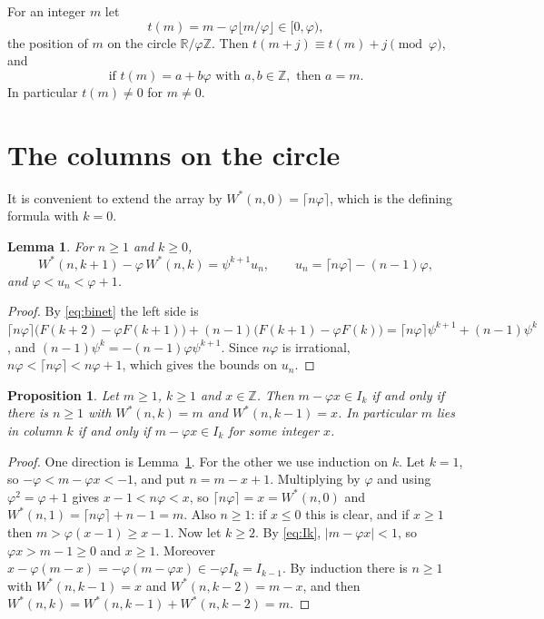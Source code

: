 \documentclass[12pt]{article}
\newcommand{\fl}[1]{\lfloor #1 \rfloor}
\newcommand{\cl}[1]{\lceil #1 \rceil}
\newcommand{\Z}{\mathbb{Z}}
\newcommand{\R}{\mathbb{R}}
\newcommand{\Ws}{W^{*}}
\theoremstyle{plain}
\newtheorem{lemma}[theorem]{Lemma}
\newtheorem{proposition}[theorem]{Proposition}
\theoremstyle{remark}
\begin{document}
For an integer $m$ let
\[
t(m)=m-\varphi\fl{m/\varphi}\in[0,\varphi),
\]
the position of $m$ on the circle $\R/\varphi\Z$. Then $t(m+j)\equiv t(m)+j\pmod\varphi$, and
\begin{equation}\label{eq:irr}
\text{if } t(m)=a+b\varphi \text{ with } a,b\in\Z, \text{ then } a=m.
\end{equation}
In particular $t(m)\neq0$ for $m\ne0$.

\section{The columns on the circle}\label{sec:circle}

It is convenient to extend the array by $\Ws(n,0)=\cl{n\varphi}$, which is the defining formula
with $k=0$.

\begin{lemma}\label{lem:row}
For $n\ge1$ and $k\ge0$,
\[
\Ws(n,k+1)-\varphi\,\Ws(n,k)=\psi^{k+1}u_n,\qquad u_n=\cl{n\varphi}-(n-1)\varphi,
\]
and $\varphi<u_n<\varphi+1$.
\end{lemma}

\begin{proof}
By \eqref{eq:binet} the left side is
$\cl{n\varphi}\bigl(F(k+2)-\varphi F(k+1)\bigr)+(n-1)\bigl(F(k+1)-\varphi F(k)\bigr)
=\cl{n\varphi}\psi^{k+1}+(n-1)\psi^k$, and $(n-1)\psi^k=-(n-1)\varphi\psi^{k+1}$. Since
$n\varphi$ is irrational, $n\varphi<\cl{n\varphi}<n\varphi+1$, which gives the bounds on $u_n$.
\end{proof}

\begin{proposition}\label{prop:col}
Let $m\ge1$, $k\ge1$ and $x\in\Z$. Then $m-\varphi x\in I_k$ if and only if there is $n\ge1$ with
$\Ws(n,k)=m$ and $\Ws(n,k-1)=x$. In particular $m$ lies in column $k$ if and only if
$m-\varphi x\in I_k$ for some integer $x$.
\end{proposition}

\begin{proof}
One direction is Lemma~\ref{lem:row}. For the other we use induction on $k$. Let $k=1$, so
$-\varphi<m-\varphi x<-1$, and put $n=m-x+1$. Multiplying by $\varphi$ and using
$\varphi^2=\varphi+1$ gives $x-1<n\varphi<x$, so $\cl{n\varphi}=x=\Ws(n,0)$ and
$\Ws(n,1)=\cl{n\varphi}+n-1=m$. Also $n\ge1$: if $x\le0$ this is clear, and if $x\ge1$ then
$m>\varphi(x-1)\ge x-1$. Now let $k\ge2$. By \eqref{eq:Ik}, $|m-\varphi x|<1$, so
$\varphi x>m-1\ge0$ and $x\ge1$. Moreover
$x-\varphi(m-x)=-\varphi(m-\varphi x)\in-\varphi I_k=I_{k-1}$. By induction there is $n\ge1$ with
$\Ws(n,k-1)=x$ and $\Ws(n,k-2)=m-x$, and then $\Ws(n,k)=\Ws(n,k-1)+\Ws(n,k-2)=m$.
\end{proof}
\end{document}
